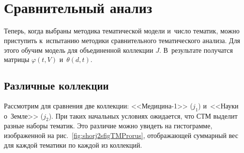 \begin{multicols}{2}
\setcounter{figure}{2}
    \begin{figure*}[b] %
\vspace*{1pt}
 \begin{center}
 \mbox{%
 \epsfxsize=163mm 
 }
 \end{center}
   \vspace*{-9pt}
\label{fig:shorj2sfigTMProrus}
\vspace*{12pt}
 \begin{center}
 \mbox{%
 \epsfxsize=163mm 
 }
 \end{center}
   \vspace*{-9pt}
\label{fig:shorj2sfigTM2Pro2rus}
    \end{figure*}

    
   
    \section{Сравнительный анализ}
    
    Теперь, когда выбраны методика тематической модели и~число тематик, можно 
приступить к~испытанию методики сравнительного тематического анализа.
    Для этого обучим модель для объединенной коллекции $J$.
    В~результате получатся матрицы $\varphi (t,V)$ и~$\theta (d,t)$.
    
    \pagebreak
  
    \subsection{Различные коллекции}
    
    
    Рассмотрим для сравнения две коллекции: <<Медицина-1>> ($j_1$)  и~<<Науки 
о~Земле>> ($j_2$).
    При таких начальных условиях ожидается, что СТМ выделит разные наборы 
тематик.
Это различие можно увидеть на гистограмме, изоб\-ра\-жен\-ной на 
рис.~\ref{fig:shorj2sfigTMProrus}, отоб\-ра\-жа\-ющей суммарный вес для каждой тематики по 
каждой из коллекций.
    
   

    
    

\end{multicols}
